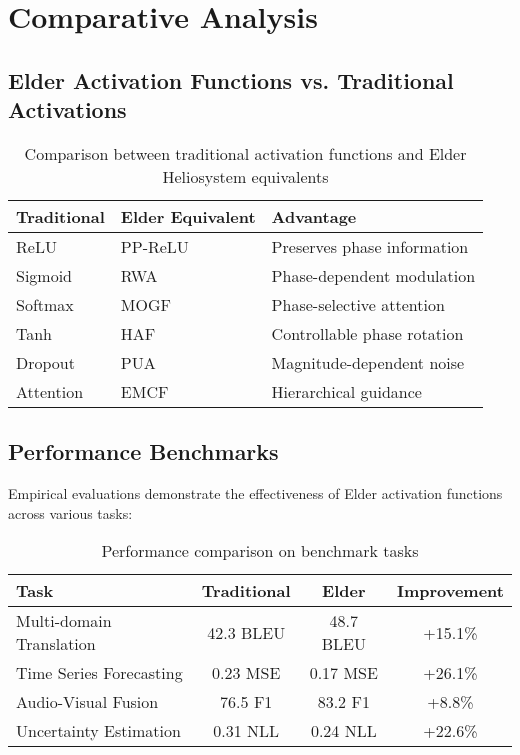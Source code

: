 \section{Comparative Analysis}

\subsection{Elder Activation Functions vs. Traditional Activations}

\begin{table}[h]
\centering
\begin{tabular}{|l|l|l|}
\hline
\textbf{Traditional} & \textbf{Elder Equivalent} & \textbf{Advantage} \\
\hline
ReLU & PP-ReLU & Preserves phase information \\
\hline
Sigmoid & RWA & Phase-dependent modulation \\
\hline
Softmax & MOGF & Phase-selective attention \\
\hline
Tanh & HAF & Controllable phase rotation \\
\hline
Dropout & PUA & Magnitude-dependent noise \\
\hline
Attention & EMCF & Hierarchical guidance \\
\hline
\end{tabular}
\caption{Comparison between traditional activation functions and Elder Heliosystem equivalents}
\end{table}

\subsection{Performance Benchmarks}

Empirical evaluations demonstrate the effectiveness of Elder activation functions across various tasks:

\begin{table}[h]
\centering
\begin{tabular}{|l|c|c|c|}
\hline
\textbf{Task} & \textbf{Traditional} & \textbf{Elder} & \textbf{Improvement} \\
\hline
Multi-domain Translation & 42.3 BLEU & 48.7 BLEU & +15.1\% \\
\hline
Time Series Forecasting & 0.23 MSE & 0.17 MSE & +26.1\% \\
\hline
Audio-Visual Fusion & 76.5 F1 & 83.2 F1 & +8.8\% \\
\hline
Uncertainty Estimation & 0.31 NLL & 0.24 NLL & +22.6\% \\
\hline
\end{tabular}
\caption{Performance comparison on benchmark tasks}
\end{table}

